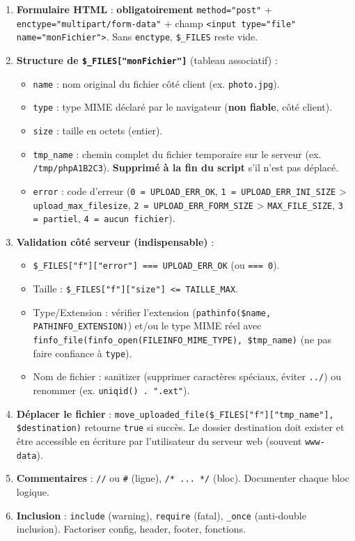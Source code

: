 \documentclass[11pt]{article}
\begin{document}
\begin{methode}
\begin{enumerate}
  \item \textbf{Formulaire HTML} : \textbf{obligatoirement} \texttt{method="post"} + \texttt{enctype="multipart/form-data"} + champ \texttt{<input type="file" name="monFichier">}. Sans \texttt{enctype}, \texttt{\$\_FILES} reste vide.
  \item \textbf{Structure de \texttt{\$\_FILES["monFichier"]}} (tableau associatif) :
        \begin{itemize}
          \item \texttt{name} : nom original du fichier côté client (ex. \texttt{photo.jpg}).
          \item \texttt{type} : type MIME déclaré par le navigateur (\textbf{non fiable}, côté client).
          \item \texttt{size} : taille en octets (entier).
          \item \texttt{tmp\_name} : chemin complet du fichier temporaire sur le serveur (ex. \texttt{/tmp/phpA1B2C3}). \textbf{Supprimé à la fin du script} s'il n'est pas déplacé.
          \item \texttt{error} : code d'erreur (\texttt{0 = UPLOAD\_ERR\_OK}, \texttt{1 = UPLOAD\_ERR\_INI\_SIZE} > \texttt{upload\_max\_filesize}, \texttt{2 = UPLOAD\_ERR\_FORM\_SIZE} > \texttt{MAX\_FILE\_SIZE}, \texttt{3 = partiel}, \texttt{4 = aucun fichier}).
        \end{itemize}
  \item \textbf{Validation côté serveur (indispensable)} :
        \begin{itemize}
          \item \texttt{\$\_FILES["f"]["error"] === UPLOAD\_ERR\_OK} (ou \texttt{=== 0}).
          \item Taille : \texttt{\$\_FILES["f"]["size"] <= TAILLE\_MAX}.
          \item Type/Extension : vérifier l'extension (\texttt{pathinfo(\$name, PATHINFO\_EXTENSION)}) et/ou le type MIME réel avec \texttt{finfo\_file(finfo\_open(FILEINFO\_MIME\_TYPE), \$tmp\_name)} (ne pas faire confiance à \texttt{type}).
          \item Nom de fichier : sanitizer (supprimer caractères spéciaux, éviter \texttt{../}) ou renommer (ex. \texttt{uniqid() . ".ext"}).
        \end{itemize}
  \item \textbf{Déplacer le fichier} : \texttt{move\_uploaded\_file(\$\_FILES["f"]["tmp\_name"], \$destination)} retourne \texttt{true} si succès. Le dossier destination doit exister et être accessible en écriture par l'utilisateur du serveur web (souvent \texttt{www-data}).
  \item \textbf{Commentaires} : \texttt{//} ou \texttt{\#} (ligne), \texttt{/* ... */} (bloc). Documenter chaque bloc logique.
  \item \textbf{Inclusion} : \texttt{include} (warning), \texttt{require} (fatal), \texttt{\_once} (anti-double inclusion). Factoriser config, header, footer, fonctions.
\end{enumerate}
\end{methode}
\end{document}
